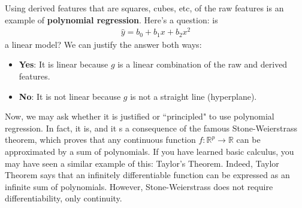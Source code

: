 \documentclass[12pt, a4paper]{article}
\theoremstyle{definition}
\begin{document}
	Using derived features that are squares, cubes, etc, of the raw features is an example
	of \textbf{polynomial regression}. Here's a question: is
	\begin{align*}
		\hat{y} = b_0 + b_1x + b_2 x^2
	\end{align*}
	a linear model? We can justify the answer both ways:
	\begin{itemize}
		\item \textbf{Yes}: It is linear because $g$ is a linear combination of the
		raw and derived features.
	\item \textbf{No}: It is not linear because $g$ is not a straight line (hyperplane).	\end{itemize}
	Now, we may ask whether it is justified or ``principled" to use polynomial regression.
	In fact, it is, and it s a consequence of the famous Stone-Weierstrass theorem, which
	proves that any continuous function $f:\mathbb{R}^p\to \mathbb{R}$ can be approximated
	by a sum of polynomials. If you have learned basic calculus, you may have seen a similar
	example of this: Taylor's Theorem. Indeed, Taylor Theorem says that an infinitely differentiable
	function can be expressed as an infinite sum of polynomials. However, Stone-Weierstrass
	does not require differentiability, only continuity.
	
\end{document}
